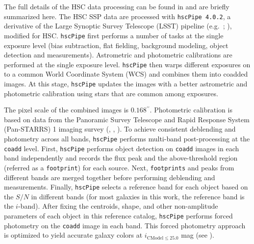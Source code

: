 \documentclass[a4paper,fleqn,usenatbib]{mnras}
\def\asec{$^{\prime\prime}$}
\begin{document}
    The full details of the HSC data processing can be found in \citet{HSC-PIPE}
    and are briefly summarized here. 
    The HSC SSP data are processed with \texttt{hscPipe 4.0.2}, a derivative of the 
    Large Synoptic Survey Telescope (LSST) pipeline (e.g.\ \citealt{Juric2015}; 
    \citealt{Axelrod2010}), modified for HSC. 
    \texttt{hscPipe} first performs a number of tasks at the single exposure level 
    (bias subtraction, flat fielding, background modeling, object detection and 
    measurements). 
    Astrometric and photometric calibrations are performed at the single exposure 
    level. 
    \texttt{hscPipe} then warps different exposures on to a common World Coordinate 
    System (WCS) and combines them into coadded images. 
    At this stage, \texttt{hscPipe} updates the images with a better astrometric and 
    photometric calibration using stars that are common among exposures. 
    
    The pixel scale of the combined images is $0.168$\asec{}. 
    Photometric calibration is based on data from the Panoramic Survey Telescope 
    and Rapid Response System (Pan-STARRS) 1 imaging survey 
    (\citealt{Schlafly2012}, \citealt{Tonry2012}, \citealt{Magnier2013}). 
    To achieve consistent deblending and photometry across all bands, \texttt{hscPipe} 
    performs multi-band post-processing at the \texttt{coadd} level. 
    First, \texttt{hscPipe} performs object detection on \texttt{coadd} images in 
    each band independently and records the flux peak and the above-threshold region 
    (referred as a \texttt{footprint}) for each source. 
    Next, \texttt{footprints} and peaks from different bands are merged together before     
    performing deblending and measurements. 
    Finally, \texttt{hscPipe} selects a reference band for each object based on the 
    $S/N$ in different bands (for most galaxies in this work, the reference band is 
    the $i$-band). 
    After fixing the centroids, shape, and other non-amplitude parameters of each 
    object in this reference catalog, \texttt{hscPipe} performs forced photometry 
    on the \texttt{coadd} image in each band. 
    This forced photometry approach is optimized to yield accurate galaxy colors
    at $i_{\mathrm{CModel}\leq25.0}$ mag (see \citealt{SynPipe}).
       
\end{document}
